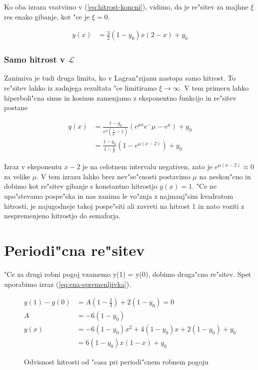 \documentclass[12pt]{article}
\begin{document}
Ko oba izraza vsatvimo v (\ref{eq:hitrost-koncni}), vidimo, da je re"sitev za majhne $\xi$ res enako gibanje, kot "ce je $\xi=0$. 

\begin{align}
  y(x) &= \frac{3}{2} (1-y_0) x (2-x) + y_0
\end{align}

\subsubsection{Samo hitrost v $\mathcal{L}$}
Zanimiva je tudi druga limita, ko v Lagran"zijanu nastopa samo hitrost. To re"sitev lahko iz zadnjega rezultata "ce limitiramo $\xi\to\infty$. V tem primeru lahko hiperboli"cna sinus in kosinus zamenjamo z eksponentno funkcijo in re"sitev postane

\begin{align}
  y(x) &= \frac{1-y_0}{e^\mu(\frac{1}{\mu} - 1)} (e^{\mu x} e^-\mu - e^\mu) + y_0\\
  &= \frac{1-y_0}{1-\frac{1}{\mu}}(1-e^{\mu(x-2)}) + y_0
\end{align}

Izraz v eksponentu $x-2$ je na celotnem intervalu negativen, zato je $e^{\mu(x-2)} \approx 0$ za velike $\mu$. V tem izrazu lahko brez nev"se"cnosti postavimo $\mu$ na neskon"cno in dobimo kot re"sitev gibanje s konstantno hitrostjo $y(x) = 1$. "Ce ne upo"stevamo pospe"ska in nas zanima le vo"znja z najmanj"sim kvadratom hitrosti, je najugodneje takoj pospe"siti ali zavreti na hitrost $1$ in nato voziti z nespremenjeno hitrostjo do semaforja. 


\section{Periodi"cna re"sitev}

"Ce za drugi robni pogoj vzamemo y(1) = y(0), dobimo druga"cno re"sitev. Spet uporabimo izraz (\ref{eq:ena-spremenljivka}). 

\begin{align}
y(1) - y(0) &= A(1-\frac{2}{3}) + 2(1-y_0) = 0 \\
A &= -6(1-y_0) \\
y(x) &=  -6(1-y_0)x^2 + 4(1-y_0)x + 2(1-y_0) + y_0 \\
&= 6(1-y_0)x(1-x) + y_0
\end{align}

\begin{figure}


\label{fig:periodicno} 
\caption{Odvisnost hitrosti od "casa pri periodi"cnem robnem pogoju}
\end{figure}
\end{document}
